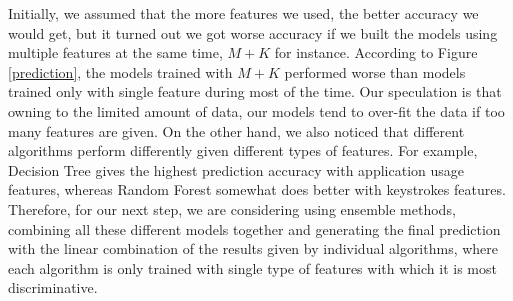 \documentclass{article}
\begin{document}
Initially, we assumed that the more features we used, the better accuracy we would get, but it turned out we got worse accuracy if we built the models using multiple features at the same time, $M+K$ for instance. According to Figure \ref{prediction}, the models trained with $M+K$ performed worse than models trained only with single feature during most of the time. Our speculation is that owning to the limited amount of data, our models tend to over-fit the data if too many features are given. On the other hand, we also noticed that different algorithms perform differently given different types of features. For example, Decision Tree gives the highest prediction accuracy with application usage features, whereas Random Forest somewhat does better with keystrokes features. Therefore, for our next step, we are considering using ensemble methods, combining all these different models together and generating the final prediction with the linear combination of the results given by individual algorithms, where each algorithm is only trained with single type of features with which it is most discriminative.  
\end{document}

